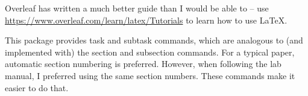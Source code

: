 \documentclass[../example.tex]{subfiles}
\begin{document}





Overleaf has written a much better guide than I would be able to -- use \url{https://www.overleaf.com/learn/latex/Tutorials} to learn how to use \LaTeX.


This package provides task and subtask commands, which are analogous to (and implemented with) the section and subsection commands. For a typical paper, automatic section numbering is preferred. However, when following the lab manual, I preferred using the same section numbers. These commands make it easier to do that.
\end{document}
